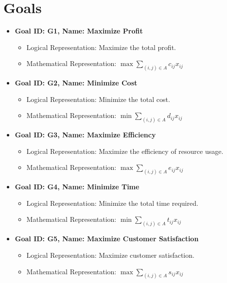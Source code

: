\documentclass{article}
\begin{document}
\section{Goals}
\begin{itemize}
    \item \textbf{Goal ID: G1, Name: Maximize Profit}
    \begin{itemize}
        \item Logical Representation: Maximize the total profit.
        \item Mathematical Representation: $\max \sum_{(i,j) \in A} c_{ij} x_{ij}$
    \end{itemize}

    \item \textbf{Goal ID: G2, Name: Minimize Cost}
    \begin{itemize}
        \item Logical Representation: Minimize the total cost.
        \item Mathematical Representation: $\min \sum_{(i,j) \in A} d_{ij} x_{ij}$
    \end{itemize}

    \item \textbf{Goal ID: G3, Name: Maximize Efficiency}
    \begin{itemize}
        \item Logical Representation: Maximize the efficiency of resource usage.
        \item Mathematical Representation: $\max \sum_{(i,j) \in A} e_{ij} x_{ij}$
    \end{itemize}

    \item \textbf{Goal ID: G4, Name: Minimize Time}
    \begin{itemize}
        \item Logical Representation: Minimize the total time required.
        \item Mathematical Representation: $\min \sum_{(i,j) \in A} t_{ij} x_{ij}$
    \end{itemize}

    \item \textbf{Goal ID: G5, Name: Maximize Customer Satisfaction}
    \begin{itemize}
        \item Logical Representation: Maximize customer satisfaction.
        \item Mathematical Representation: $\max \sum_{(i,j) \in A} s_{ij} x_{ij}$
    \end{itemize}
\end{itemize}
\end{document}
